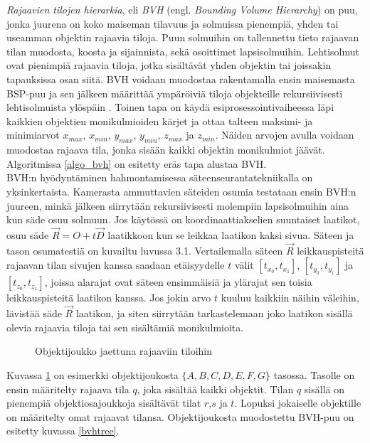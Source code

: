 \documentclass[a4paper, 12pt, titlepage]{article}
\begin{document}
\emph{Rajaavien tilojen hierarkia}, eli \emph{BVH} (engl. \emph{Bounding Volume Hierarchy}) on puu, jonka juurena on koko maiseman tilavuus ja solmuissa pienempiä, yhden tai useamman objektin rajaavia tiloja. Puun solmuihin on tallennettu tieto rajaavan tilan muodosta, koosta ja sijainnista, sekä osoittimet lapsisolmuihin. Lehtisolmut ovat pienimpiä rajaavia tiloja, jotka sisältävät yhden objektin tai joissakin tapauksissa osan siitä. BVH voidaan muodostaa rakentamalla ensin maisemasta BSP-puu ja sen jälkeen määrittää ympäröiviä tiloja objekteille rekursiivisesti lehtisolmuista ylöspäin \citep{hughes}. Toinen tapa on käydä esiprosessointivaiheessa läpi kaikkien objektien monikulmioiden kärjet ja ottaa talteen maksimi- ja minimiarvot $x_{max}$, $x_{min}$, $y_{max}$, $y_{min}$, $z_{max}$ ja $z_{min}$. Näiden arvojen avulla voidaan muodostaa rajaava tila, jonka sisään kaikki objektin monikulmiot jäävät. \citep[.]{janke} Algoritmissa \ref{algo_bvh} on esitetty eräs tapa alustaa BVH.\\



BVH:n hyödyntäminen hahmontamisessa säteenseurantatekniikalla on yksinkertaista. Kamerasta ammuttavien säteiden osumia testataan ensin BVH:n juureen, minkä jälkeen siirrytään rekursiivisesti molempiin lapsisolmuihin aina kun säde osuu solmuun. Jos käytössä on koordinaattiakselien suuntaiset laatikot, osuu säde $\vec{R}=O+t\vec{D}$ laatikkoon kun se leikkaa laatikon kaksi sivua. Säteen ja tason osumatestiä on kuvailtu luvussa 3.1. Vertailemalla säteen $\vec{R}$ leikkauspisteitä rajaavan tilan sivujen kanssa saadaan etäisyydelle $t$ välit $[t_{x_0}, t_{x_1}]$, $[t_{y_0}, t_{y_1}]$ ja $[t_{z_0}, t_{z_1}]$, joissa alarajat ovat säteen ensimmäisiä ja ylärajat sen toisia leikkauspisteitä laatikon kanssa. Jos jokin arvo $t$ kuuluu kaikkiin näihin väleihin, lävistää säde $\vec{R}$ laatikon, ja siten siirrytään tarkastelemaan joko laatikon sisällä olevia rajaavia tiloja tai sen sisältämiä monikulmioita. \citep[.]{janke}\\

\begin{figure}[htp]
 \centering 
 \def\svgwidth{0.8\linewidth}
 
 \caption{Objektijoukko jaettuna rajaaviin tiloihin}
 \label{bvh}
\end{figure}



Kuvassa \ref{bvh} on esimerkki objektijoukosta $\{A,B,C,D,E,F,G\}$ tasossa. Tasolle on ensin määritelty rajaava tila $q$, joka sisältää kaikki objektit. Tilan $q$ sisällä on pienempiä objektiosajoukkoja sisältävät tilat $r$,$s$ ja $t$. Lopuksi jokaiselle objektille on määritelty omat rajaavat tilansa. Objektijoukosta muodostettu BVH-puu on esitetty kuvassa \ref{bvhtree}.   \\
\end{document}
